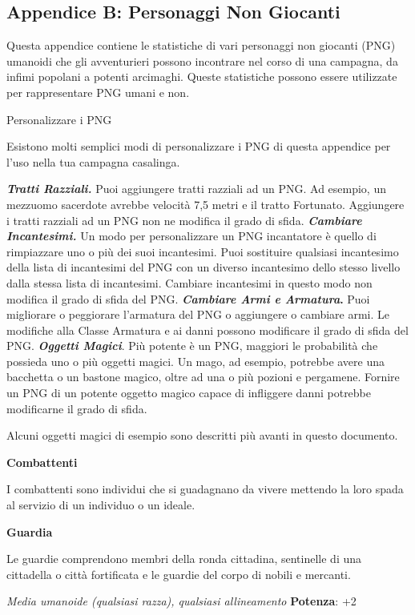 \begin{multicols}{2}
\subsection{Appendice B: Personaggi Non Giocanti}

Questa appendice contiene le statistiche di vari personaggi non giocanti
(PNG) umanoidi che gli avventurieri possono incontrare nel corso di una
campagna, da infimi popolani a potenti arcimaghi. Queste statistiche
possono essere utilizzate per rappresentare PNG umani e non.

Personalizzare i PNG

Esistono molti semplici modi di personalizzare i PNG di questa appendice
per l'uso nella tua campagna casalinga.

\emph{\textbf{Tratti Razziali.}} Puoi aggiungere tratti razziali ad un
PNG. Ad esempio, un mezzuomo sacerdote avrebbe velocità 7,5 metri e il
tratto Fortunato. Aggiungere i tratti razziali ad un PNG non ne modifica
il grado di sfida. \emph{\textbf{Cambiare Incantesimi.}} Un modo per
personalizzare un PNG incantatore è quello di rimpiazzare uno o più dei
suoi incantesimi. Puoi sostituire qualsiasi incantesimo della lista di
incantesimi del PNG con un diverso incantesimo dello stesso livello
dalla stessa lista di incantesimi. Cambiare incantesimi in questo modo
non modifica il grado di sfida del PNG. \textbf{\emph{Cambiare Armi e
Armatura}.} Puoi migliorare o peggiorare l'armatura del PNG o aggiungere
o cambiare armi. Le modifiche alla Classe Armatura e ai danni possono
modificare il grado di sfida del PNG. \emph{\textbf{Oggetti Magici}}.
Più potente è un PNG, maggiori le probabilità che possieda uno o più
oggetti magici. Un mago, ad esempio, potrebbe avere una bacchetta o un
bastone magico, oltre ad una o più pozioni e pergamene. Fornire un PNG
di un potente oggetto magico capace di infliggere danni potrebbe
modificarne il grado di sfida.

Alcuni oggetti magici di esempio sono descritti più avanti in questo
documento.

\textbf{Combattenti}

I combattenti sono individui che si guadagnano da vivere mettendo la
loro spada al servizio di un individuo o un ideale.

\textbf{Guardia}

Le guardie comprendono membri della ronda cittadina, sentinelle di una
cittadella o città fortificata e le guardie del corpo di nobili e
mercanti.

\emph{Media umanoide (qualsiasi razza), qualsiasi allineamento}
\textbf{Potenza}: +2


\end{multicols}
